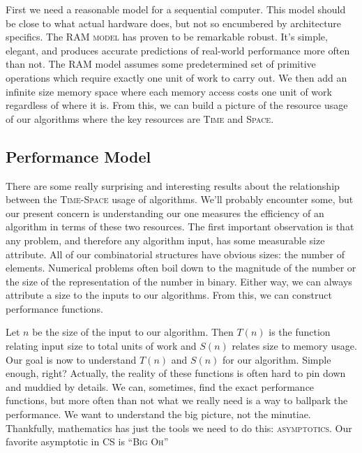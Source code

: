 \documentclass[]{tufte-handout}
\begin{document}
First we need a reasonable model for a sequential computer. This model should be close to what actual hardware does, but not so encumbered by architecture specifics.  The \textsc{RAM model} has proven to be remarkable robust.  It's simple, elegant, and produces accurate predictions of real-world performance more often than not. The \textsc{RAM} model assumes some predetermined set of primitive operations which require exactly one unit of work to carry out. We then add an infinite size memory space where each memory access costs one unit of work regardless of where it is. From this, we can build a picture of the resource usage of our algorithms where the key resources are \textsc{Time} and \textsc{Space}.  

\subsection{Performance Model}

There are some really surprising and interesting results about the relationship between the \textsc{Time-Space} usage of algorithms. We'll probably encounter some, but our present concern is understanding our one measures the efficiency of an algorithm in terms of these two resources. The first important observation is that any problem, and therefore any algorithm input, has some measurable size attribute.  All of our combinatorial structures have obvious sizes: the number of elements.  Numerical problems often boil down to the magnitude of the number or the size of the representation of the number in binary.  Either way, we can always attribute a size to the inputs to our algorithms.  From this, we can construct performance functions.

Let $n$ be the size of the input to our algorithm. Then $T(n)$ is the function relating input size to total units of work and $S(n)$ relates size to memory usage. Our goal is now to understand $T(n)$ and $S(n)$ for our algorithm. Simple enough, right? Actually, the reality of these functions is often hard to pin down and muddied by details. We can, sometimes, find the exact performance functions, but more often than not what we really need is a way to ballpark the performance. We want to understand the big picture, not the minutiae. Thankfully, mathematics has just the tools we need to do this: \textsc{asymptotics}.  Our favorite asymptotic in CS is ``\textsc{Big Oh}''  
\end{document}
